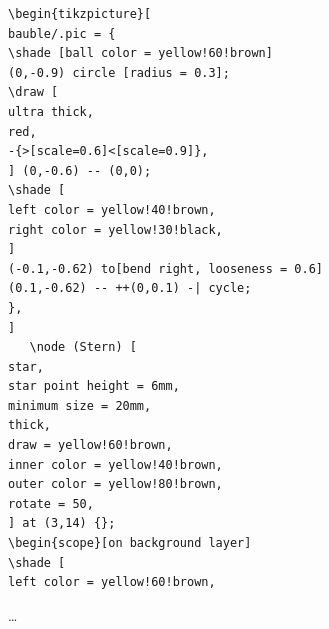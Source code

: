 %
%	
%	
%	
%	
%	
%


\begin{frame}[fragile]%

\begin{columns}

\begin{column}{.5\textwidth}

\tiny
\begin{lstlisting}
\begin{tikzpicture}[
bauble/.pic = {
\shade [ball color = yellow!60!brown]
(0,-0.9) circle [radius = 0.3];
\draw [
ultra thick,
red,
-{>[scale=0.6]<[scale=0.9]},
] (0,-0.6) -- (0,0);
\shade [
left color = yellow!40!brown,
right color = yellow!30!black,
]
(-0.1,-0.62) to[bend right, looseness = 0.6]
(0.1,-0.62) -- ++(0,0.1) -| cycle;
},
]
   \node (Stern) [
star,
star point height = 6mm,
minimum size = 20mm,
thick,
draw = yellow!60!brown,
inner color = yellow!40!brown,
outer color = yellow!80!brown,
rotate = 50,
] at (3,14) {};
\begin{scope}[on background layer]
\shade [
left color = yellow!60!brown,
\end{lstlisting}
\dots\ 

\end{column}	
\begin{column}{.5\textwidth}



\end{column}
\end{columns}

\end{frame}

